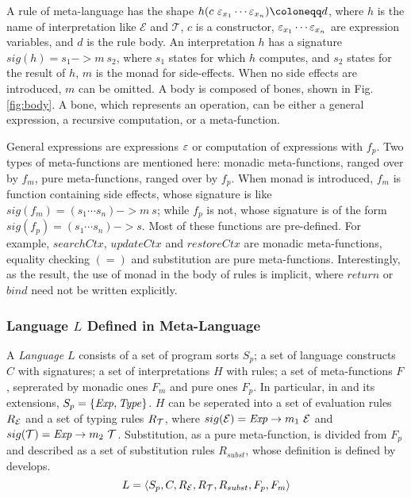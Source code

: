 A rule of meta-language has the shape $h(c~\mexp_{x_1}\cdots \mexp_{x_n}) \cqq d$, 
 where $h$ is the name of interpretation like $\mathcal{E}$ and $\mathcal{T}$,
 $c$ is a constructor, 
 $\varepsilon_{x_1}\cdots \varepsilon_{x_n}$ are expression variables,
 and $d$ is the rule body.
An interpretation $h$ has a signature $sig(h)=s_1->m~s_2$, 
 where $s_1$ states for which $h$ computes,
 and $s_2$ states for the result of $h$,
 $m$ is the monad for side-effects.
When no side effects are introduced, $m$ can be omitted.
A body is composed of bones, shown in Fig. \ref{fig:body}.
A bone, which represents an operation, 
 can be either a general expression, 
 a recursive computation,
 or a meta-function.

General expressions are expressions $\varepsilon$ or computation of expressions with $f_p$.
Two types of meta-functions are mentioned here:
 monadic meta-functions, ranged over by $f_m$,
 pure meta-functions, ranged over by $f_p$.
When monad is introduced,
 $f_m$ is function containing side effects, 
  whose signature is like $sig(f_m)=(s_1\cdots s_n)->m~s$;
 while $f_p$ is not,
  whose signature is of the form $sig(f_p)=(s_1\cdots s_n)->s$.
Most of these functions are pre-defined.
For example, $searchCtx$, $updateCtx$ and $restoreCtx$ are monadic meta-functions,
 equality checking $(=)$ and substitution are pure meta-functions.
Interestingly, as the result, the use of monad in the body of rules is implicit,
 where $return$ or $bind$ need not be written explicitly.

\subsubsection{Language $L$ Defined in Meta-Language}
A \textit{Language} $L$ consists of a set of program sorts $S_p$;
 a set of language constructs $C$ with signatures;
 a set of interpretations $H$ with rules;
 a set of meta-functions $F$, seprerated by monadic ones $F_m$ and pure ones $F_p$.
In particular, in \STLC and its extensions, $S_p=\{\mathit{Exp},\mathit{Type}\}$.
$H$ can be seperated into a set of evaluation rules $R_{\mathcal{E}}$ and a set of typing rules $R_{\mathcal{T}}$,
 where $sig(\mathcal{E})=\mathit{Exp}->m_1~\mathcal{E}$ and $sig(\mathcal{T})=\mathit{Exp}->m_2~\mathcal{T}$.
Substitution, as a pure meta-function, is divided from $F_p$ and described as a set of substitution rules $R_{subst}$,
 whose definition is defined by develops.
\[ L=\langle S_p, C, R_{\mathcal{E}}, R_{\mathcal{T}}, R_{subst}, F_p, F_m \rangle \]

